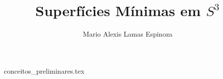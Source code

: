 \documentclass[12pt]{book}
\title{Superfícies Mínimas em $S^3$}
\author{Mario Alexis Lamas Espinoza}
\date{ }
\theoremstyle{definition}
\theoremstyle{definition}
\theoremstyle{definition}
\theoremstyle{definition}
\theoremstyle{definition}
\theoremstyle{definition}
\begin{document}
\maketitle

\tableofcontents

{conceitos_preliminares.tex}



\end{document}
